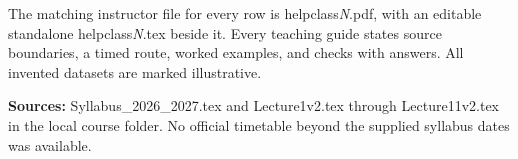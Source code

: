 \documentclass[11pt,a4paper]{article}
\begin{document}
The matching instructor file for every row is helpclass\emph{N}.pdf, with an editable standalone helpclass\emph{N}.tex beside it. Every teaching guide states source boundaries, a timed route, worked examples, and checks with answers. All invented datasets are marked illustrative.

\textbf{Sources:} Syllabus\_2026\_2027.tex and Lecture1v2.tex through Lecture11v2.tex in the local course folder. No official timetable beyond the supplied syllabus dates was available.
\end{document}
